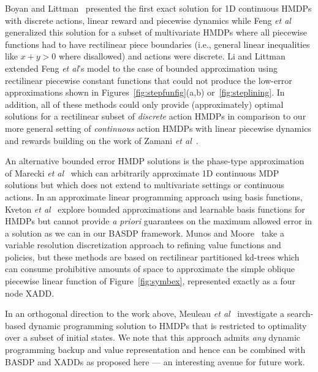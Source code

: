 Boyan and Littman~\cite{boyan01} presented the first exact solution
for 1D continuous HMDPs with discrete actions, linear reward and
piecewise dynamics while Feng {\it et al}~\cite{feng04} generalized
this solution for a subset of multivariate HMDPs where all piecewise
functions had to have rectilinear piece boundaries (i.e., general
linear inequalities like $x + y > 0$ where disallowed) and actions
were discrete.  Li and Littman~\cite{li05} extended Feng {\it et al}'s
model to the case of bounded approximation using rectilinear piecewise
constant functions that %
 could not produce
the low-error approximations shown in Figures~\ref{fig:stepfunfig}(a,b)
or~\ref{fig:steplining}.  In addition,  all of these methods
could only provide (approximately) optimal solutions for a rectilinear
subset of \emph{discrete} action HMDPs in comparison to our
more general setting of \emph{continuous} action HMDPs with 
linear piecewise dynamics and rewards building on the work of Zamani
{\it et al}~\cite{zamani12}.  

An alternative bounded error HMDP solutions is the phase-type
approximation of Marecki {\it et al}~\cite{phase07} which can
arbitrarily approximate 1D continuous MDP solutions but which does not
extend to multivariate settings or continuous actions.
In an approximate linear programming approach using basis functions, 
Kveton {\it et al}~\cite{kveton06,kveton06aaai} explore bounded
approximations and learnable basis functions for HMDPs but cannot provide 
\emph{a priori} guarantees on the maximum allowed error in a solution
as we can in our BASDP framework.  Munos and Moore~\cite{munos02} take
a variable resolution discretization approach to refining value
functions and policies, but these methods are based on rectilinear
partitioned kd-trees which can consume
prohibitive amounts of space to approximate the simple oblique
piecewise linear function of Figure~\ref{fig:symbex}, 
represented exactly as a four node XADD.

In an orthogonal direction to the work above, Meuleau {\it et
al}~\cite{hao09} investigate a search-based dynamic programming
solution to HMDPs that is restricted to optimality over a subset of
initial states.  We note that this approach admits \emph{any} dynamic
programming backup and value representation and hence can be combined with
BASDP and XADDs as proposed here --- an interesting avenue for future
work.

